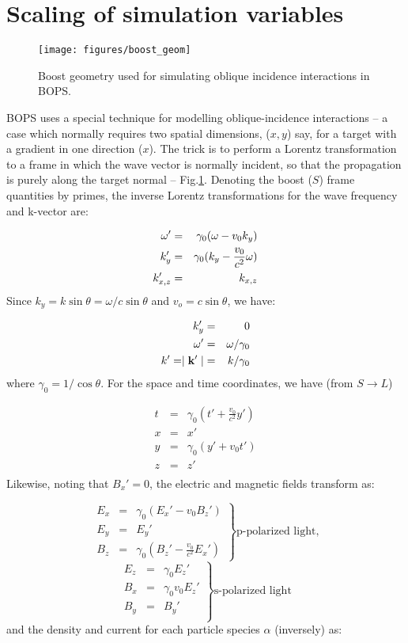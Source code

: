 \documentclass[11pt]{article}
\def\bea{\begin{eqnarray}}
\def\eea{\end{eqnarray}}
\begin{document}
\section{Scaling of simulation variables}
\label{scaling}
\begin{figure}[ht]
\begin{center}
\texttt{[image: figures/boost\_geom]}
\caption{Boost geometry used for simulating oblique incidence interactions in BOPS.}
\end{center}
\label{boost}
\end{figure}
BOPS uses a special technique for modelling oblique-incidence interactions -- a case which normally requires two spatial dimensions, ($x,y$) say, for a target with a gradient in one direction ($x$).  The trick is to perform a Lorentz transformation to a frame in which the wave vector is normally incident, so that the propagation is purely along the target normal --   Fig.\ref{boost}.  Denoting the boost ($S$) frame quantities by primes, the inverse Lorentz transformations for the wave 
frequency and k-vector are:

\bea
\omega' & = & \gamma_0(\omega - v_0k_y) \nonumber \\
\vspace{0.5cm}
k_y' & = & \gamma_0(k_y - \frac{v_0}{c^2}\omega) \nonumber \\
k_{x,z}' & = & k_{x,z} \nonumber 
\eea
%
Since $k_y = k\sin\theta = \omega/c\sin\theta$ and $v_o = c\sin\theta$, we
have:

\bea
k_y' & = & 0 \nonumber \\
\omega' & = & \omega/\gamma_0 \label{freq} \\
k' = \mid {\bf k}'\mid & = & k/\gamma_0 \nonumber
\eea
where $\gamma_0 = 1/\cos\theta$.  For the space and time coordinates, we have (from $S\rightarrow L$)

\bea
t & = & \gamma_0(t' + \frac{v_0}{c^2}y') \nonumber \\
x & = & x' \nonumber  \\
y & = & \gamma_0(y' + v_0 t') \nonumber\\
z & = & z' \label{time} \\
\eea
%
Likewise, noting that $B_x'=0$, the electric and magnetic fields transform as:

$$\left. \begin{array}{rcl}
E_x & = & \gamma_0(E_x' - v_0B_z')  \\
E_y & = & E_y'  \\
B_z & = & \gamma_0(B_z' - \frac{v_0}{c^2}E_x')
\end{array} \right\}  \mbox{p-polarized light,} $$ 
$$\left. \begin{array}{rcl}
E_z & = & \gamma_0 E_z'  \\
B_x & = & \gamma_0v_0E_z'\\
B_y & = & B_y'\label{fields} \\
\end{array} \right\} \mbox{s-polarized light}$$
\begin{equation} \end{equation}
and the density and current for each particle species $\alpha$ (inversely) as:
\end{document}
